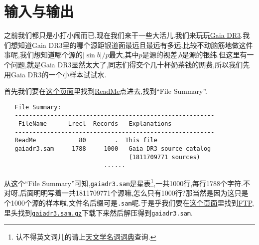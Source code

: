 \chapter{输入与输出}\label{io}

之前我们都只是小打小闹而已,现在我们来干一些大活儿.我们来玩玩\href{https://cdsarc.cds.unistra.fr/viz-bin/cat/I/355}{Gaia DR3}.我们想知道Gaia DR3里的哪个源距银道面最远且最远有多远,比较不动脑筋地做这件事呢,我们想知道哪个源的$\left\lvert \sin b\right\rvert/p$最大,其中$p$是源的视差,$b$是源的银纬.但这里有一个问题,就是Gaia DR3显然太大了,同志们得交个几十杯奶茶钱的网费,所以我们先用Gaia DR3的一个小样本试试水.

首先我们要在\href{https://cdsarc.cds.unistra.fr/viz-bin/cat/I/355}{这个页面}里找到\href{https://cdsarc.cds.unistra.fr/viz-bin/ReadMe/I/355?format=html&tex=true}{ReadMe}点进去,找到``File Summary''.
\begin{lstlisting}
   File Summary:
   --------------------------------------------------------
    FileName      Lrecl  Records   Explanations
   --------------------------------------------------------
   ReadMe            80        .  This file
   gaiadr3.sam     1788     1000   Gaia DR3 source catalog
                                   (1811709771 sources)
                            ......
\end{lstlisting}
从这个``File Summary''可知,\texttt{gaiadr3.sam}是星表\footnote{认不得英文词儿的请上\href{https://nadc.china-vo.org/astrodict/}{天文学名词词典}查询.},一共1000行,每行1788个字符.不对呀,后面明明写着一共1811709771个源嘛,怎么只有1000行?那当然是因为这只是个1000个源的样本啦,文件名后缀可是\texttt{.sam}呢.于是乎我们要在\href{https://cdsarc.cds.unistra.fr/viz-bin/cat/I/355}{这个页面}里找到\href{https://cdsarc.cds.unistra.fr/ftp/I/355}{FTP},里头找到\href{https://cdsarc.cds.unistra.fr/ftp/I/355/gaiadr3.sam.gz}{\texttt{gaiadr3.sam.gz}}下载下来然后解压得到\texttt{gaiadr3.sam}.

